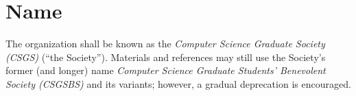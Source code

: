 \section{Name}

The organization shall be known as the \textit{Computer Science Graduate
    Society (CSGS)} (``the Society''). Materials and references may still use the
Society's former (and longer) name \textit{Computer Science Graduate Students’
    Benevolent Society (CSGSBS)} and its variants; however, a gradual deprecation
is encouraged.